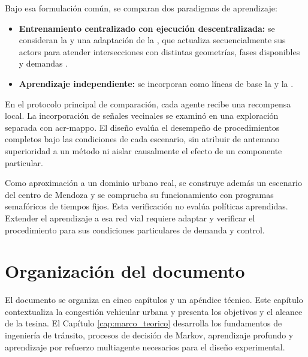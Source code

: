 Bajo esa formulación común, se comparan dos paradigmas de aprendizaje:
\begin{itemize}
    \item \textbf{Entrenamiento centralizado con ejecución descentralizada:} se consideran la  y una adaptación de la , que actualiza secuencialmente sus \glspl{actor} para atender intersecciones con distintas geometrías, fases disponibles y demandas \cite{kuba2021trust}.
    \item \textbf{Aprendizaje independiente:} se incorporan como líneas de base la  y la .
\end{itemize}

En el protocolo principal de comparación, cada agente recibe una recompensa local. La incorporación de señales vecinales se examinó en una exploración separada con \acrshort{acr-mappo}. El diseño evalúa el desempeño de procedimientos completos bajo las condiciones de cada escenario, sin atribuir de antemano superioridad a un método ni aislar causalmente el efecto de un componente particular.

Como aproximación a un dominio urbano real, se construye además un escenario del centro de Mendoza y se comprueba su funcionamiento con programas semafóricos de tiempos fijos. Esta verificación no evalúa políticas aprendidas. Extender el aprendizaje a esa red vial requiere adaptar y verificar el procedimiento para sus condiciones particulares de demanda y control.

\section{Organización del documento}\label{sec:organizacion_documento}

El documento se organiza en cinco capítulos y un apéndice técnico. Este capítulo contextualiza la congestión vehicular urbana y presenta los objetivos y el alcance de la tesina. El Capítulo \ref{cap:marco_teorico} desarrolla los fundamentos de ingeniería de tránsito, procesos de decisión de Markov, aprendizaje profundo y aprendizaje por refuerzo multiagente necesarios para el diseño experimental.

